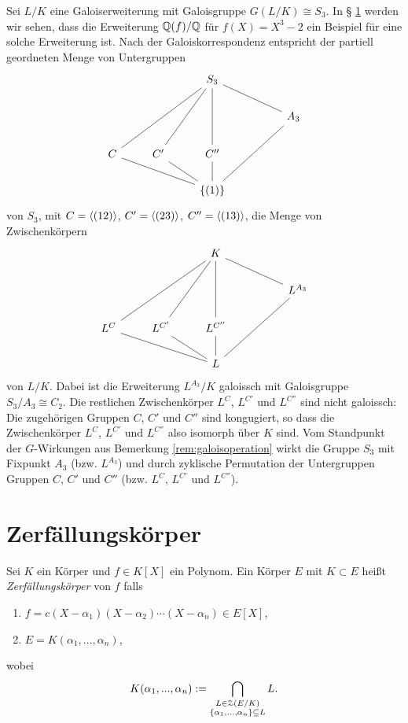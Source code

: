 \documentclass{book}
\begin{document}
\begin{exa}
    \label{exa:label}
    Sei $L/K$ eine Galoiserweiterung mit Galoisgruppe $G(L/K) \cong S_3$. In \S
    \ref{sub:zerfallungskorper} werden wir sehen, dass die Erweiterung
    $\mathbb{Q}(f)/\mathbb{Q}$ für $f(X) = X^3 - 2$ ein Beispiel für eine solche
    Erweiterung ist. Nach der Galoiskorrespondenz entspricht der partiell
    geordneten Menge von Untergruppen
    \[
    \begin{tikzcd}
        & &S_3  & & \\
        & & & & A_3 \ar[ull,dash]\\
        C \ar[uurr,dash] & C'\ar[uur,dash] & C''\ar[uu,dash] &   \\
        & & \{ (1) \}\ar[ull,dash]\ar[ul,dash]\ar[u,dash]\ar[uurr,dash]&  & 
    \end{tikzcd}
    \]
    von $S_3$, mit $C = \langle (12) \rangle$, $C' = \langle (23) \rangle$, $C'' = \langle (13) \rangle$, die Menge von Zwischenkörpern
    \[
    \begin{tikzcd}
        & &K  & & \\
        & & & & L^{A_3} \ar[ull,dash]\\
        L^{C}\ar[uurr,dash] & L^{C'}\ar[uur,dash] & L^{C''} \ar[uu,dash] &   \\
        & & L\ar[ull,dash]\ar[ul,dash]\ar[u,dash]\ar[uurr,dash]&  & 
    \end{tikzcd}
    \]
    von $L/K$. Dabei ist die Erweiterung $L^{A_3}/K$ galoissch mit Galoisgruppe
    $S_3/A_3 \cong C_2$. Die restlichen Zwischenkörper $L^C$, $L^{C'}$ und
    $L^{C''}$ sind nicht galoissch: Die zugehörigen Gruppen $C$, $C'$ und
    $C''$ sind kongugiert, so dass die Zwischenkörper $L^C$, $L^{C'}$ und
    $L^{C''}$ also isomorph über $K$ sind. Vom Standpunkt der $G$-Wirkungen aus
    Bemerkung \ref{rem:galoisoperation} wirkt die Gruppe $S_3$ mit Fixpunkt
    $A_3$ (bzw. $L^{A_3}$) und durch zyklische Permutation der Untergruppen
    Gruppen $C$, $C'$ und $C''$ (bzw. $L^C$, $L^{C'}$ und $L^{C''}$).
\end{exa}

\section{Zerfällungskörper}%
\label{sub:zerfallungskorper}

\begin{defi}
    \label{defi:zerfällung}
    Sei $K$ ein Körper und $f \in K[X]$ ein Polynom. Ein Körper $E$ mit $K \subset E$ heißt {\em Zerfällungskörper} von $f$ falls
    \begin{enumerate}
        \item $f = c (X - \alpha_1)(X- \alpha_2) \cdots (X - \alpha_n) \in E[X]$,
        \item $E = K(\alpha_1, ..., \alpha_n)$,
    \end{enumerate}
    wobei 
    \[
        K(\alpha_1, ..., \alpha_n) := \bigcap_{ \substack{ L \in \EuScript{Z}(E/K)\\ \{\alpha_1, ..., \alpha_n \} \subseteq L } } L.
    \]
\end{defi}
\end{document}

